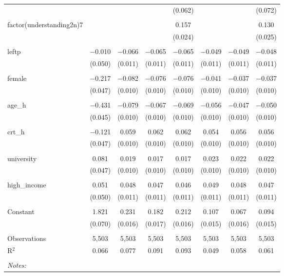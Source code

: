 \begin{table}[!htbp]
\begin{tabular}{@{\extracolsep{5pt}}lccccccc}
  &  &  &  & (0.062) &  &  & (0.072) \\ 
  & & & & & & & \\ 
 factor(understanding2n)7 &  &  &  & 0.157 &  &  & 0.130 \\ 
  &  &  &  & (0.024) &  &  & (0.025) \\ 
  & & & & & & & \\ 
 leftp & $-$0.010 & $-$0.066 & $-$0.065 & $-$0.065 & $-$0.049 & $-$0.049 & $-$0.048 \\ 
  & (0.050) & (0.011) & (0.011) & (0.011) & (0.011) & (0.011) & (0.011) \\ 
  & & & & & & & \\ 
 female & $-$0.217 & $-$0.082 & $-$0.076 & $-$0.076 & $-$0.041 & $-$0.037 & $-$0.037 \\ 
  & (0.047) & (0.010) & (0.010) & (0.010) & (0.010) & (0.010) & (0.010) \\ 
  & & & & & & & \\ 
 age\_h & $-$0.431 & $-$0.079 & $-$0.067 & $-$0.069 & $-$0.056 & $-$0.047 & $-$0.050 \\ 
  & (0.045) & (0.010) & (0.010) & (0.010) & (0.010) & (0.010) & (0.010) \\ 
  & & & & & & & \\ 
 crt\_h & $-$0.121 & 0.059 & 0.062 & 0.062 & 0.054 & 0.056 & 0.056 \\ 
  & (0.047) & (0.010) & (0.010) & (0.010) & (0.010) & (0.010) & (0.010) \\ 
  & & & & & & & \\ 
 university & 0.081 & 0.019 & 0.017 & 0.017 & 0.023 & 0.022 & 0.022 \\ 
  & (0.047) & (0.010) & (0.010) & (0.010) & (0.010) & (0.010) & (0.010) \\ 
  & & & & & & & \\ 
 high\_income & 0.051 & 0.048 & 0.047 & 0.046 & 0.049 & 0.048 & 0.047 \\ 
  & (0.050) & (0.011) & (0.011) & (0.011) & (0.011) & (0.011) & (0.011) \\ 
  & & & & & & & \\ 
 Constant & 1.821 & 0.231 & 0.182 & 0.212 & 0.107 & 0.067 & 0.094 \\ 
  & (0.070) & (0.016) & (0.017) & (0.016) & (0.015) & (0.016) & (0.015) \\ 
  & & & & & & & \\ 
Observations & 5,503 & 5,503 & 5,503 & 5,503 & 5,503 & 5,503 & 5,503 \\ 
R$^{2}$ & 0.066 & 0.077 & 0.091 & 0.093 & 0.049 & 0.058 & 0.061 \\ 
\hline \\[-1.8ex] 
\textit{Notes:} & \multicolumn{7}{l}{} \\ 
\end{tabular} 
\end{table} 
